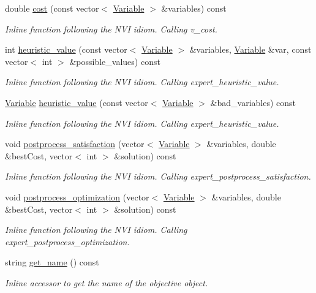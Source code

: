 \begin{DoxyCompactItemize}
double \hyperlink{classghost_1_1Objective_a15d4c24042c87834dd0ccbf2a2c856f8}{cost} (const vector$<$ \hyperlink{classghost_1_1Variable}{Variable} $>$ \&variables) const 
\begin{DoxyCompactList}\small\item\em Inline function following the N\+VI idiom. Calling v\+\_\+cost. \end{DoxyCompactList}\item 
int \hyperlink{classghost_1_1Objective_a99802c1672d9e28944c1fe9586128214}{heuristic\+\_\+value} (const vector$<$ \hyperlink{classghost_1_1Variable}{Variable} $>$ \&variables, \hyperlink{classghost_1_1Variable}{Variable} \&var, const vector$<$ int $>$ \&possible\+\_\+values) const 
\begin{DoxyCompactList}\small\item\em Inline function following the N\+VI idiom. Calling expert\+\_\+heuristic\+\_\+value. \end{DoxyCompactList}\item 
\hyperlink{classghost_1_1Variable}{Variable} \hyperlink{classghost_1_1Objective_a5f712482ee747fe308a719f9090deb56}{heuristic\+\_\+value} (const vector$<$ \hyperlink{classghost_1_1Variable}{Variable} $>$ \&bad\+\_\+variables) const 
\begin{DoxyCompactList}\small\item\em Inline function following the N\+VI idiom. Calling expert\+\_\+heuristic\+\_\+value. \end{DoxyCompactList}\item 
void \hyperlink{classghost_1_1Objective_ad68d6414519c6cc1542603d729af8bdb}{postprocess\+\_\+satisfaction} (vector$<$ \hyperlink{classghost_1_1Variable}{Variable} $>$ \&variables, double \&best\+Cost, vector$<$ int $>$ \&solution) const 
\begin{DoxyCompactList}\small\item\em Inline function following the N\+VI idiom. Calling expert\+\_\+postprocess\+\_\+satisfaction. \end{DoxyCompactList}\item 
void \hyperlink{classghost_1_1Objective_a96be4da0c23406cc67b190a37f328b91}{postprocess\+\_\+optimization} (vector$<$ \hyperlink{classghost_1_1Variable}{Variable} $>$ \&variables, double \&best\+Cost, vector$<$ int $>$ \&solution) const 
\begin{DoxyCompactList}\small\item\em Inline function following the N\+VI idiom. Calling expert\+\_\+postprocess\+\_\+optimization. \end{DoxyCompactList}\item 
string \hyperlink{classghost_1_1Objective_a27e8ef04bf5cfc74d931742a578b282e}{get\+\_\+name} () const 
\begin{DoxyCompactList}\small\item\em Inline accessor to get the name of the objective object. \end{DoxyCompactList}\end{DoxyCompactItemize}
